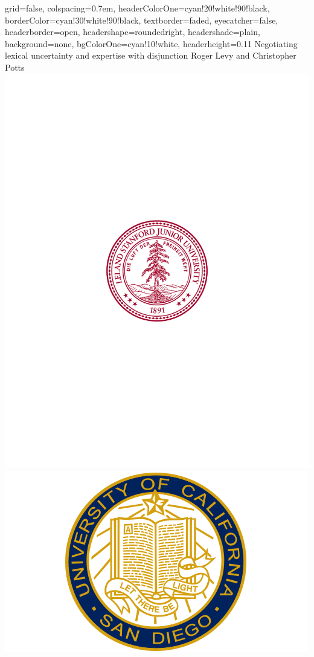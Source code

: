 \documentclass[landscape,a0paper,fontscale=0.292]{baposter}
\begin{document}
\begin{poster}{
    grid=false,
    colspacing=0.7em,
    headerColorOne=cyan!20!white!90!black,
    borderColor=cyan!30!white!90!black,
    textborder=faded,
    eyecatcher=false,
    headerborder=open,
    headershape=roundedright,
    headershade=plain,
    background=none,
    bgColorOne=cyan!10!white,
    headerheight=0.11\textheight
}
{} %
{Negotiating lexical uncertainty and expertise with disjunction\vspace{0.25em}}
{Roger Levy and Christopher Potts}
{\includegraphics[height=0.10\textheight]{stanford}\hspace{-20pt}\includegraphics[height=0.10\textheight]{ucsd}}


\end{poster}
\end{document}
